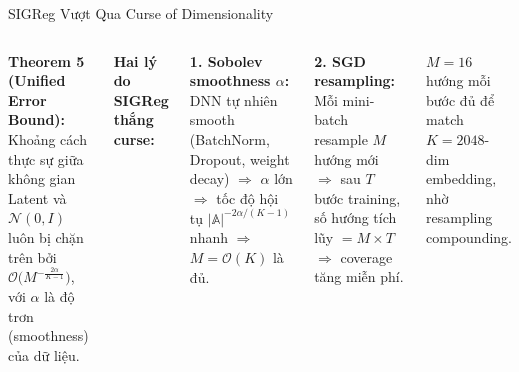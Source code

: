 \documentclass[aspectratio=169,9pt]{beamer}
\begin{document}
\begin{frame}{SIGReg Vượt Qua Curse of Dimensionality}

\begin{columns}[T]

\textbf{Theorem 5 (Unified Error Bound):}\\[4pt]
Khoảng cách thực sự giữa không gian Latent và $\mathcal{N}(0,I)$ luôn bị chặn trên bởi $\mathcal{O}\big(M^{-\frac{2\alpha}{K-1}}\big)$, với $\alpha$ là độ trơn (smoothness) của dữ liệu.

\vspace{0.6em}

\vspace{0.3em}

\textbf{Hai lý do SIGReg thắng curse:}

\vspace{0.4em}
\begin{primarybox}
\footnotesize \textbf{1. Sobolev smoothness $\alpha$:} DNN tự nhiên smooth (BatchNorm, Dropout, weight decay) $\Rightarrow$ $\alpha$ lớn $\Rightarrow$ tốc độ hội tụ $|\mathbb{A}|^{-2\alpha/(K-1)}$ nhanh $\Rightarrow$ $M=\mathcal{O}(K)$ là đủ.
\end{primarybox}

\vspace{0.4em}
\begin{primarybox}
\footnotesize \textbf{2. SGD resampling:} Mỗi mini-batch resample $M$ hướng mới $\Rightarrow$ sau $T$ bước training, số hướng tích lũy $=M\times T$ $\Rightarrow$ coverage tăng miễn phí.
\end{primarybox}

\vspace{0.4em}
\begin{goodbox}
\footnotesize $M=16$ hướng mỗi bước đủ để match $K=2048$-dim embedding, nhờ resampling compounding.
\end{goodbox}

\end{columns}
\end{frame}
\end{document}
